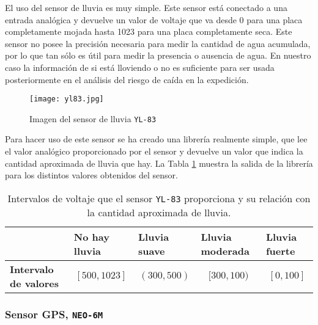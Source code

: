 El uso del sensor de lluvia es muy simple. Este sensor está conectado a una entrada analógica y devuelve un valor de voltaje que va desde 0 para una placa completamente mojada hasta 1023 para una placa completamente seca. Este sensor no posee la precisión necesaria para medir la cantidad de agua acumulada, por lo que tan sólo es útil para medir la presencia o ausencia de agua. En nuestro caso la información de si está lloviendo o no es suficiente para ser usada posteriormente en el análisis del riesgo de caída en la expedición.


\begin{figure}[!h]
    \centering
    \texttt{[image: yl83.jpg]}
    \caption{Imagen del sensor de lluvia \texttt{YL-83} \protect\footnotemark}
    \label{fig:myfig}
\end{figure}


Para hacer uso de este sensor se ha creado una librería realmente simple, que lee el valor analógico proporcionado por el sensor y devuelve un valor que indica la cantidad aproximada de lluvia que hay. La Tabla \ref{table:yl83lib} muestra la salida de la librería para los distintos valores obtenidos del sensor.

\begin{table}[!h]
\centering
\begin{tabular}{l|l|l|l|l|}
\cline{2-5}
                                           & \textbf{No hay lluvia}                      & \textbf{Lluvia suave}                      & \textbf{Lluvia moderada}                   & \textbf{Lluvia fuerte}                   \\ \hline
\multicolumn{1}{|l|}{\textbf{Intervalo de valores}} & \multicolumn{1}{c|}{$[500, 1023]$} & \multicolumn{1}{c|}{$(300, 500)$} & \multicolumn{1}{c|}{$[300, 100)$} & \multicolumn{1}{c|}{$[0, 100]$} \\ \hline
\end{tabular}
\caption{Intervalos de voltaje que el sensor \texttt{YL-83} proporciona y su relación con la cantidad aproximada de lluvia.}
\label{table:yl83lib}
\end{table}

\subsubsection{Sensor \ac{GPS}, \texttt{NEO-6M}}

